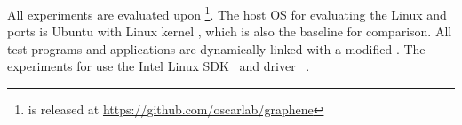 All experiments are evaluated upon \graphene{} \grapheneversion{}\footnote{\graphene{} is released at \url{https://github.com/oscarlab/graphene}}.
The host OS for evaluating the Linux and \sgx{} ports is Ubuntu \ubuntuversion{} with Linux kernel \linuxversion{},
which is also the baseline for comparison.
All test programs and applications are dynamically linked
with a modified \glibc{} \glibcversion{}.
The experiments for \graphenesgx{}
use the Intel \sgx{} Linux SDK~\cite{intel-sgx-linux-sdk} and driver~\cite{intel-sgx-linux-driver} \sgxdriverversion{}.











